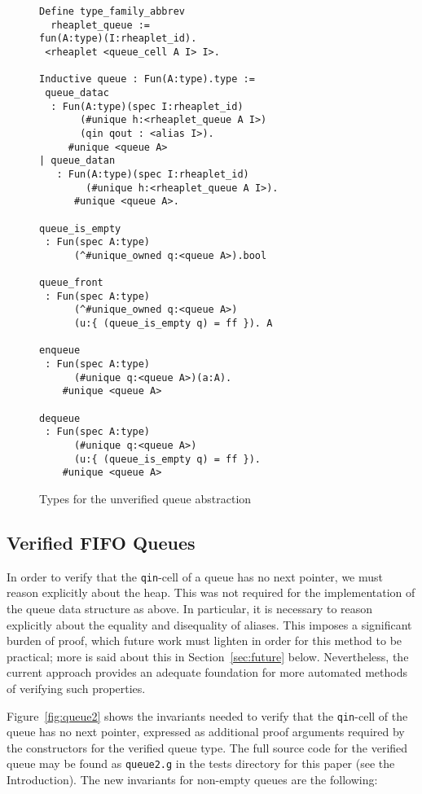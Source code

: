 \documentclass[9pt,natbib]{sigplanconf}
\begin{document}
\begin{figure}
\small
\begin{verbatim}
Define type_family_abbrev
  rheaplet_queue := 
fun(A:type)(I:rheaplet_id).
 <rheaplet <queue_cell A I> I>.

Inductive queue : Fun(A:type).type :=
 queue_datac
  : Fun(A:type)(spec I:rheaplet_id)
       (#unique h:<rheaplet_queue A I>)
       (qin qout : <alias I>).
     #unique <queue A>
| queue_datan
   : Fun(A:type)(spec I:rheaplet_id)
        (#unique h:<rheaplet_queue A I>).
      #unique <queue A>.

queue_is_empty
 : Fun(spec A:type)
      (^#unique_owned q:<queue A>).bool

queue_front
 : Fun(spec A:type)
      (^#unique_owned q:<queue A>)
      (u:{ (queue_is_empty q) = ff }). A 
 
enqueue
 : Fun(spec A:type)
      (#unique q:<queue A>)(a:A).
    #unique <queue A> 

dequeue
 : Fun(spec A:type)
      (#unique q:<queue A>)
      (u:{ (queue_is_empty q) = ff }).
    #unique <queue A>
\end{verbatim}
\caption{Types for the unverified queue abstraction}
\label{fig:queue}
\end{figure}

\subsection{Verified FIFO Queues}
\label{sec:queues}

In order to verify that the \texttt{qin}-cell of a queue has no next
pointer, we must reason explicitly about the heap.  This was not
required for the implementation of the queue data structure as above.
In particular, it is necessary to reason explicitly about the equality
and disequality of aliases.  This imposes a significant burden of
proof, which future work must lighten in order for this method to be
practical; more is said about this in Section~\ref{sec:future} below.
Nevertheless, the current approach provides an adequate foundation for
more automated methods of verifying such properties.

Figure~\ref{fig:queue2} shows the invariants needed to verify that the
\texttt{qin}-cell of the queue has no next pointer, expressed as
additional proof arguments required by the constructors for the
verified queue type.  The full source code for the verified queue may
be found as \texttt{queue2.g} in the tests directory for this paper
(see the Introduction).  The new invariants for non-empty queues are
the following:
\end{document}
